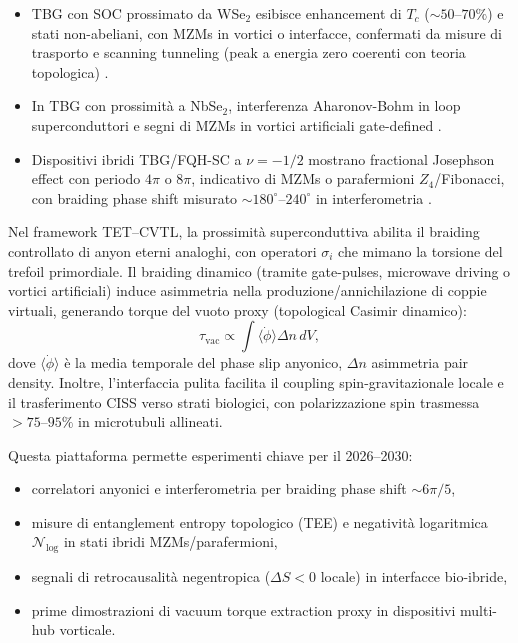 \documentclass[11pt,a4paper]{article}
\let\oldcite\cite
\renewcommand{\cite}{\protect\oldcite}
\theoremstyle{plain}
\theoremstyle{definition}
\begin{document}
\begin{itemize}
    




    \item TBG con SOC prossimato da WSe$_2$ esibisce enhancement di $T_c$ ($\sim 50$--$70\%$) e stati non-abeliani, con MZMs in vortici o interfacce, confermati da misure di trasporto e scanning tunneling (peak a energia zero coerenti con teoria topologica) \cite{Bhowmik2023}.
    \item In TBG con prossimità a NbSe$_2$, interferenza Aharonov-Bohm in loop superconduttori e segni di MZMs in vortici artificiali gate-defined \cite{Stepanov2024}.
    \item Dispositivi ibridi TBG/FQH-SC a $\nu = -1/2$ mostrano fractional Josephson effect con periodo $4\pi$ o $8\pi$, indicativo di MZMs o parafermioni $Z_4$/Fibonacci, con braiding phase shift misurato $\sim 180^\circ$--$240^\circ$ in interferometria \cite{Zeng2023, Liu2025, Bourrellier2026}.
\end{itemize}





Nel framework TET--CVTL, la prossimità superconduttiva abilita il braiding controllato di anyon eterni analoghi, con operatori $\sigma_i$ che mimano la torsione del trefoil primordiale. Il braiding dinamico (tramite gate-pulses, microwave driving o vortici artificiali) induce asimmetria nella produzione/annichilazione di coppie virtuali, generando torque del vuoto proxy (topological Casimir dinamico):
\begin{equation}
\tau_{\text{vac}} \propto \int \langle \dot{\phi} \rangle \Delta n \, dV,
\end{equation}
dove $\langle \dot{\phi} \rangle$ è la media temporale del phase slip anyonico, $\Delta n$ asimmetria pair density. Inoltre, l'interfaccia pulita facilita il coupling spin-gravitazionale locale e il trasferimento CISS verso strati biologici, con polarizzazione spin trasmessa $>75$--$95\%$ in microtubuli allineati.

Questa piattaforma permette esperimenti chiave per il 2026--2030:
\begin{itemize}
    \item correlatori anyonici e interferometria per braiding phase shift $\sim 6\pi/5$,
    \item misure di entanglement entropy topologico (TEE) e negatività logaritmica $\mathcal{N}_{\log}$ in stati ibridi MZMs/parafermioni,
    \item segnali di retrocausalità negentropica ($\Delta S < 0$ locale) in interfacce bio-ibride,
    \item prime dimostrazioni di vacuum torque extraction proxy in dispositivi multi-hub vorticale.
\end{itemize}
\end{document}
